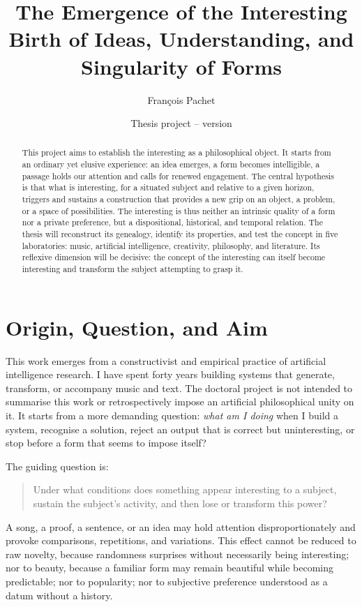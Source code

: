 \documentclass[11pt,a4paper]{article}
\title{The Emergence of the Interesting\\
\large Birth of Ideas, Understanding, and Singularity of Forms}
\author{François Pachet}
\date{Thesis project -- version \projectversion\\\small \projectdate}
\begin{document}
\maketitle

\begin{abstract}
This project aims to establish the interesting as a philosophical object. It
starts from an ordinary yet elusive experience: an idea emerges, a form becomes
intelligible, a passage holds our attention and calls for renewed engagement.
The central hypothesis is that what is interesting, for a situated subject and
relative to a given horizon, triggers and sustains a construction that provides
a new grip on an object, a problem, or a space of possibilities. The interesting
is thus neither an intrinsic quality of a form nor a private preference, but a
dispositional, historical, and temporal relation. The thesis will reconstruct
its genealogy, identify its properties, and test the concept in five
laboratories: music, artificial intelligence, creativity, philosophy, and
literature. Its reflexive dimension will be decisive: the concept of the
interesting can itself become interesting and transform the subject attempting
to grasp it.
\end{abstract}

\section{Origin, Question, and Aim}

This work emerges from a constructivist and empirical practice of artificial
intelligence research. I have spent forty years building systems that generate,
transform, or accompany music and text. The doctoral project is not intended to
summarise this work or retrospectively impose an artificial philosophical unity
on it. It starts from a more demanding question: \emph{what am I doing} when I
build a system, recognise a solution, reject an output that is correct but
uninteresting, or stop before a form that seems to impose itself?

The guiding question is:

\begin{quote}
Under what conditions does something appear interesting to a subject, sustain
the subject's activity, and then lose or transform this power?
\end{quote}

A song, a proof, a sentence, or an idea may hold attention disproportionately
and provoke comparisons, repetitions, and variations. This effect cannot be
reduced to raw novelty, because randomness surprises without necessarily being
interesting; nor to beauty, because a familiar form may remain beautiful while
becoming predictable; nor to popularity; nor to subjective preference
understood as a datum without a history.
\end{document}
